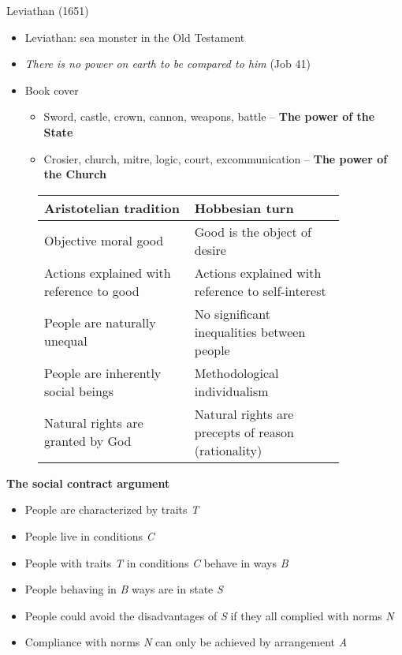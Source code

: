 Leviathan (1651)

\begin{itemize}
    \item Leviathan: sea monster in the Old Testament
    \item \textit{There is no power on earth to be compared to him} (Job 41)
    \item Book cover
    \begin{itemize}
        \item Sword, castle, crown, cannon, weapons, battle -- \textbf{The 
        power of the State}
        \item Crosier, church, mitre, logic, court, excommunication -- \textbf{
        The power of the Church}
    \end{itemize}
\end{itemize}

\begin{figure}[H]
    \centering
    \begin{tabular}{p{0.45\linewidth} | p{0.45\linewidth}}
        \textbf{Aristotelian tradition} & \textbf{Hobbesian turn} \\
        \hline
        Objective moral good & Good is the object of desire \\
        Actions explained with reference to good & Actions explained with
        reference to self-interest \\
        People are naturally unequal & No significant inequalities between
        people \\
        People are inherently social beings & Methodological individualism \\
        Natural rights are granted by God & Natural rights are precepts of 
        reason (rationality) \\
    \end{tabular}
\end{figure}

\textbf{The social contract argument}

\begin{itemize}
    \item People are characterized by traits \textit{T}
    \item People live in conditions \textit{C}
    \item People with traits \textit{T} in conditions \textit{C} behave in
    ways \textit{B}
    \item People behaving in \textit{B} ways are in state \textit{S}
    \item People could avoid the disadvantages of \textit{S} if they all
    complied with norms \textit{N}
    \item Compliance with norms \textit{N} can only be achieved by
    arrangement \textit{A}
\end{itemize}

